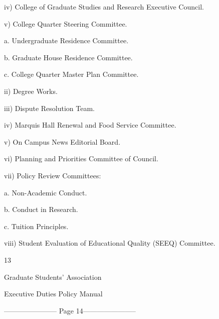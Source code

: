          iv)       College of Graduate Studies and Research Executive Council.   

  

         v)        College Quarter Steering Committee.   

  

              a.       Undergraduate Residence Committee.   

              b.        Graduate House Residence Committee.   

  

              c.        College Quarter Master Plan Committee.   

  

         ii)       Degree Works.   

  

         iii)      Dispute Resolution Team.   

  

         iv)       Marquis Hall Renewal and Food Service Committee.   

  

         v)        On Campus News Editorial Board.   

  

         vi)       Planning and Priorities Committee of Council.   

  

         vii)      Policy Review Committees:   

  

              a.       Non-Academic Conduct.   

  

              b.        Conduct in Research.   

              c.        Tuition Principles.   

  

         viii)     Student Evaluation of Educational Quality (SEEQ) Committee.   



                                                        13  

                                       

                                     Graduate Students’ Association  

                                    Executive Duties Policy Manual  

  


----------------------- Page 14-----------------------

